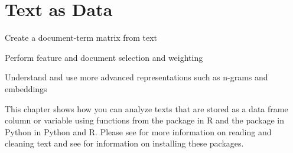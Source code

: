 \chapter{Text as Data}
\label{chap:dtm}

\begin{abstract}{Abstract}
  
This chapter shows you how to do `data wrangling' in R and Python.
Data wrangling is the process of transforming raw data into a shape that is suitable for analysis. The sections of this chapter first take you through the normal data wrangling pipeline of
filtering, changing, grouping, and joining data. Finally, the last section shows how you can
reshape data.
\end{abstract}


\begin{objectives}
\item Create a document-term matrix from text
\item Perform feature and document selection and weighting
\item Understand and use more advanced representations such as n-grams and embeddings
\end{objectives}

\begin{feature}
  This chapter shows how you can analyze texts that are stored as a data frame column or variable using functions from the package  in R and the package  in Python in Python and R.
  Please see  for more information on reading and cleaning text and see  for information on installing these packages.
\end{feature}




